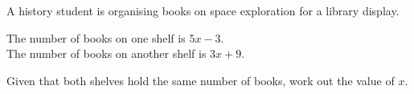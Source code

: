 \begin{question}
\noindent A history student is organising books on space exploration for a library display.

The number of books on one shelf is $5x - 3$.\\
The number of books on another shelf is $3x + 9$.

Given that both shelves hold the same number of books, work out the value of $x$.
\vspace{4cm}
\end{question}